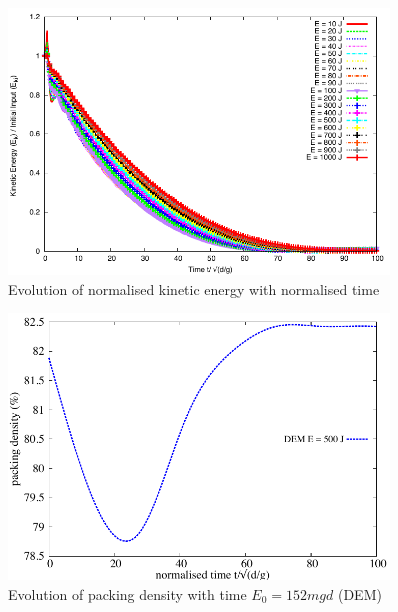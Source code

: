 \begin{figure}[tbhp]
\centering
\includegraphics[width=0.9\textwidth]{Normalised_Energy_Time_Slope_DEM}
\caption{Evolution of normalised kinetic energy with normalised time}
\label{fig:Normalised_Energy_Time_Slope_DEM}
\end{figure}

\begin{figure}[tbhp]
\centering
\includegraphics[width=0.9\textwidth]{voro_500}
\caption{Evolution of packing density with time $E_0 = 152 mgd$ (DEM)}
\label{fig:voro_500}
\end{figure}

